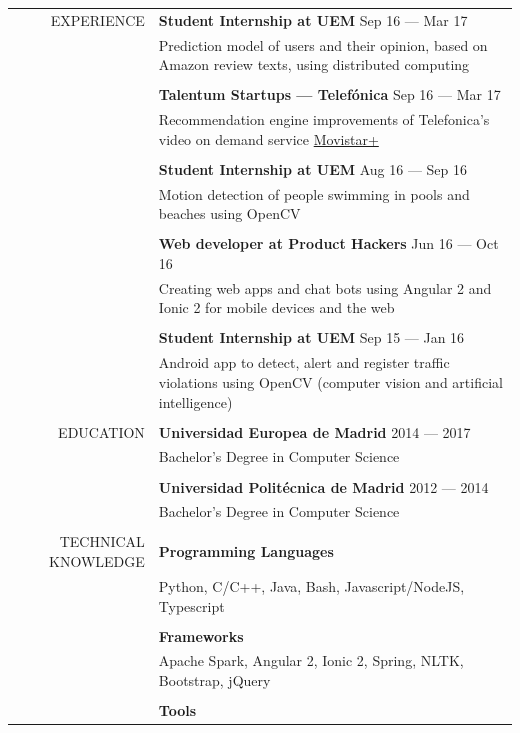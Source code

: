 \documentclass[a4paper, 11pt]{article}
\begin{document}
\begin{longtable}{rp{11cm}}
    EXPERIENCE
    & {\bf Student Internship at UEM} \hfill Sep 16 --- Mar 17\\
    & Prediction model of users and their opinion, based on Amazon review texts, using distributed computing\\
    \\
    & {\bf Talentum Startups --- Telefónica} \hfill Sep 16 --- Mar 17\\
    & Recommendation engine improvements of Telefonica's video on demand service \href{http://ver.movistarplus.es/}{Movistar+}\\
    \\
    & {\bf Student Internship at UEM} \hfill Aug 16 --- Sep 16\\
    & Motion detection of people swimming in pools and beaches using OpenCV\\
    \\
    & {\bf Web developer at Product Hackers} \hfill Jun 16 --- Oct 16\\
    & Creating web apps and chat bots using Angular 2 and Ionic 2 for mobile devices and the web\\
    \\
    & {\bf Student Internship at UEM} \hfill Sep 15 --- Jan 16\\
    & Android app to detect, alert and register traffic violations using OpenCV (computer vision and artificial intelligence)\\
    \\
    EDUCATION
    & {\bf Universidad Europea de Madrid} \hfill 2014 --- 2017\\
    & Bachelor's Degree in Computer Science\\
    \\
    & {\bf Universidad Politécnica de Madrid} \hfill 2012 --- 2014\\
    & Bachelor's Degree in Computer Science\\ 
    \\
    TECHNICAL KNOWLEDGE
    & {\bf Programming Languages}\\
    & Python, C/C++, Java, Bash, Javascript/NodeJS, Typescript\\
    \\
    & {\bf Frameworks}\\
    & Apache Spark, Angular 2, Ionic 2, Spring, NLTK, Bootstrap, jQuery\\
    \\
    & {\bf Tools}\\

\end{longtable}
\end{document}
